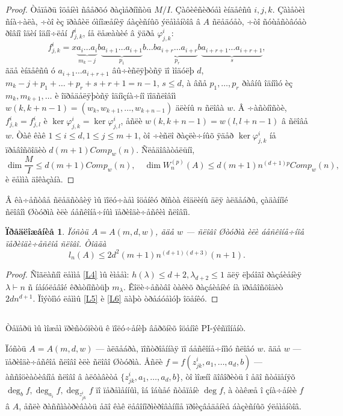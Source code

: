 \documentclass{article}
\numberwithin{equation}{section}
\theoremstyle{plain}
\newtheorem{propos}{Ïðåäëîæåíèå}
\theoremstyle{definition}
\newtheorem{proof}{Äîêàçàòåëüñòâî}
\begin{document}
\begin{fulltext}
\begin{proof}
Òåïåðü îöåíèì ñâåðõó ðàçìåðíîñòü $M/I$.
Çàôèêñèðóåì èíäåêñû $i,j,k$. Çàìåòèì ñíà÷àëà, ÷òî èç ïðàâèë óìíîæåíèÿ áàçèñíûõ ýëåìåíòîâ â 
$A$ ñëåäóåò, ÷òî ñóùåñòâóåò ðîâíî îäèí îäíî÷ëåí $f^i_{j,k}$, íå ëåæàùèé â ÿäðå
 $\varphi^i_{j,k}$:
$$
f^i_{j,k}=x\underbrace{a_i\ldots a_i}_{m_k-j}b 
\underbrace{a_{i+1}\ldots a_{i+1}}_{p_1}b\ldots b \underbrace{a_{i+r}\ldots a_{i+r}}_{p_r}b
\underbrace{a_{i+r+1}\ldots a_{i+r+1}}_{s},
$$
ãäå èíäåêñû ó $a_{i+1}\ldots a_{i+r+1}$ âû÷èñëÿþòñÿ ïî ìîäóëþ $d$,
$m_k-j+p_1+\ldots+p_r+s+r+1=n-1$, $s\le d$, à âñå $p_1,\ldots, p_r$ ðàâíû îäíîìó èç
$m_k,m_{k+1},\ldots$ è îïðåäåëÿþòñÿ îäíîçíà÷íî ïîäñëîâîì $w(k, k+n-1) =
(w_k,w_{k+1},\ldots ,w_{k+n-1})$ äëèíû $n$ ñëîâà $w$. Â ÷àñòíîñòè, $f^i_{j,k}=f^i_{j,l}$ è
$\ker\varphi^i_{j,k}= \ker\varphi^i_{j,l}$, åñëè $w(k, k+n-1)=w(l, l+n-1)$ â ñëîâå $w$.
Òàê êàê $1\le i \le d, 1\le j \le m+1$, òî ÷èñëî ðàçëè÷íûõ ÿäåð $\ker\varphi^i_{j,k}$ íå
ïðåâîñõîäèò $d(m+1)Comp_w(n)$. Ñëåäîâàòåëüíî,
$$
\dim\frac{M}{I} \le d(m+1)Comp_w(n),\quad \dim W_n^{(p)}(A) \le d(m+1)n^{(d+1)p} Comp_w(n),
$$
è ëåììà äîêàçàíà.
\end{proof}

Â êà÷åñòâå ñëåäñòâèÿ ìû ïîëó÷àåì îöåíêó ðîñòà êîäëèíû äëÿ àëãåáðû, çàäàííîé ñëîâîì Øòóðìà èëè 
áåñêîíå÷íûì ïåðèîäè÷åñêèì ñëîâîì.

\begin{propos}\label{p2}
Ïóñòü $A=A(m,d,w)$, ãäå $w$ ---  ñëîâî Øòóðìà èëè áåñêîíå÷íîå ïåðèîäè÷åñêîå ñëîâî. 
Òîãäà
$$
l_n(A) \le 2d^2(m+1)n^{(d+1)(d+3)}(n+1).
$$
\end{propos}
\begin{proof}
Ñîãëàñíî ëåììå \ref{L4} ìû èìååì: $h(\lambda)\le d+2, \lambda_{d+2}\le 1$ äëÿ ëþáîãî
ðàçáèåíèÿ $\lambda\vdash n$ ñ íåíóëåâîé êðàòíîñòüþ $m_\lambda$. Êîëè÷åñòâî òàêèõ
ðàçáèåíèé íà ïðåâîñõîäèò $2d n^{d+1}$. Ïîýòîìó ëåììû \ref{L5} è \ref{L6} äàþò
òðåáóåìóþ îöåíêó.
\end{proof}

\subsection{}\label{s3.3}
Òåïåðü ìû ìîæåì ïðèñòóïèòü ê ïîëó÷åíèþ âåðõíèõ îöåíîê PI-ýêñïîíåíò.

Ïóñòü $A=A(m,d,w)$ --- àëãåáðà, ïîñòðîåííàÿ ïî áåñêîíå÷íîìó ñëîâó $w$. ãäå 
$w$ --- ïåðèîäè÷åñêîå ñëîâî èëè ñëîâî Øòóðìà. Åñëè $f=f(z^i_{jk},a_1,\ldots,a_d,b)$ ---
àññîöèàòèâíîå ñëîâî â àëôàâèòå $\{z^i_{jk},a_1,\ldots,a_d,b\}$, òî ìîæíî ãîâîðèòü î åãî
ñòåïåíÿõ $\deg_b f,\deg_{a_i}f,\deg_{z^i_{jk}}f$ ïî ïåðåìåííûì, îá îáùåé ñòåïåíè $\deg f$,
à òàêæå î çíà÷åíèè $f$ â $A$, åñëè ðàññìàòðèâàòü åãî êàê ëåâîíîðìèðîâàííîå ïðîèçâåäåíèå
áàçèñíûõ ýëåìåíòîâ.


\end{fulltext}
\end{document}
